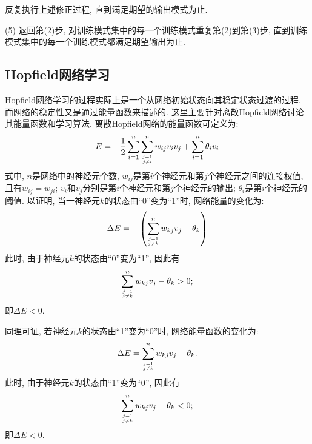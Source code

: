     反复执行上述修正过程, 直到满足期望的输出模式为止.

(5) 返回第(2)步, 对训练模式集中的每一个训练模式重复第(2)到第(3)步, 直到训练模式集中的每一个训练模式都满足期望输出为止.
\subsection{Hopfield网络学习}
Hopfield网络学习的过程实际上是一个从网络初始状态向其稳定状态过渡的过程. 而网络的稳定性又是通过能量函数来描述的. 这里主要针对离散Hopfield网络讨论其能量函数和学习算法.
离散Hopfield网络的能量函数可定义为:
\begin{align}
    E=-\frac{1}{2} \sum_{i=1}^{n} \sum_{j=1 \atop j \neq i}^{n} w_{i j} v_{i} v_{j}+\sum_{i=1}^{n} \theta_{i} v_{i}
\end{align}
式中, $n$是网络中的神经元个数, $w_{ij}$是第$i$个神经元和第$j$个神经元之间的连接权值, 且有$w_{ij}=w_{ji}$;  $v_i$和$v_j$分别是第$i$个神经元和第$j$个神经元的输出; $\theta_i$是第$i$个神经元的阈值.
以证明, 当一神经元$k$的状态由“0”变为“1”时, 网络能量的变化为:
\begin{align}
    \Delta E=-\left(\sum_{j=1 \atop j \neq k}^{n} w_{k j} v_{j}-\theta_{k}\right)
\end{align}
此时, 由于神经元$k$的状态由“0”变为“1”, 因此有
\begin{align}
    \sum_{j=1 \atop j \neq k}^{n} w_{k j} v_{j}-\theta_{k}>0;
\end{align}
即$\Delta E<0$.

同理可证, 若神经元$k$的状态由“1”变为“0”时, 网络能量函数的变化为:
\begin{align}
    \Delta E=\sum_{j=1 \atop j \neq k}^{n} w_{k j} v_{j}-\theta_{k}.
\end{align}
此时, 由于神经元$k$的状态由“1”变为“0”, 因此有
\begin{align}
    \sum_{j=1 \atop j \neq k}^{n} w_{k j} v_{j}-\theta_{k}<0;
\end{align}
即$\Delta E<0$.


